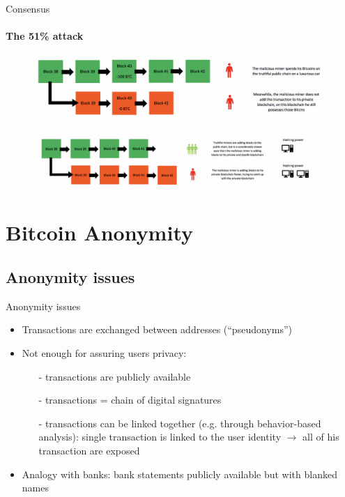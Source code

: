 \documentclass{beamer}
\begin{document}
  
  
  \begin{frame}{Consensus}
  \framesubtitle{The 51\% attack}
      \begin{figure}
          \centering
          \includegraphics[width=1\linewidth]{../img/attack_1.png}
      \end{figure}
      \begin{figure}
          \centering
          \includegraphics[width=1\linewidth]{../img/attack_2.png}
      \end{figure}
  \end{frame}
  
  
  
  \section{Bitcoin Anonymity}
  \subsection{Anonymity issues}
  \begin{frame}{Anonymity issues}
      \begin{itemize}
          \item Transactions are exchanged between addresses (``pseudonyms'')
          \item Not enough for assuring users privacy: 
          \begin{itemize}
              \item[-] transactions are publicly available
              \item[-] transactions = chain of digital signatures
              \item[-] transactions can be linked together (e.g. through behavior-based analysis): single transaction is linked to the user identity $\rightarrow$ all of his transaction are exposed
          \end{itemize}
          \item Analogy with banks: bank statements publicly available but with blanked names
      \end{itemize}
  \end{frame}
  
\end{document}
